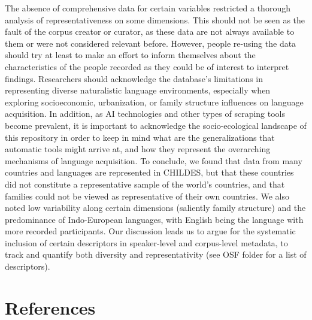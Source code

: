 \documentclass[
  man,floatsintext]{apa6}
\begin{document}
The absence of comprehensive data for certain variables restricted a thorough analysis of representativeness on some dimensions. This should not be seen as the fault of the corpus creator or curator, as these data are not always available to them or were not considered relevant before. However, people re-using the data should try at least to make an effort to inform themselves about the characteristics of the people recorded as they could be of interest to interpret findings. Researchers should acknowledge the database's limitations in representing diverse naturalistic language environments, especially when exploring socioeconomic, urbanization, or family structure influences on language acquisition. In addition, as AI technologies and other types of scraping tools become prevalent, it is important to acknowledge the socio-ecological landscape of this repository in order to keep in mind what are the generalizations that automatic tools might arrive at, and how they represent the overarching mechanisms of language acquisition.
To conclude, we found that data from many countries and languages are represented in CHILDES, but that these countries did not constitute a representative sample of the world's countries, and that families could not be viewed as representative of their own countries. We also noted low variability along certain dimensions (saliently family structure) and the predominance of Indo-European languages, with English being the language with more recorded participants. Our discussion leads us to argue for the systematic inclusion of certain descriptors in speaker-level and corpus-level metadata, to track and quantify both diversity and representativity (see OSF folder for a list of descriptors).

\newpage

\hypertarget{references}{%
\section*{References}\label{references}}
\end{document}
